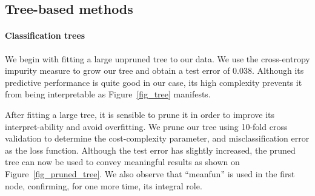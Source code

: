\subsection{Tree-based methods}
\paragraph{Classification trees}
We begin with fitting a large unpruned tree to our data. We use the cross-entropy impurity measure to grow our tree and obtain a test error of \num{0.038}. Although its predictive performance is quite good in our case, its high complexity prevents it from being interpretable as Figure~\ref{fig_tree} manifests.

After fitting a large tree, it is sensible to prune it in order to improve its interpret-ability and avoid overfitting. We prune our tree using \num{10}-fold cross validation to determine the cost-complexity parameter, and misclassification error as the loss function. Although the test error has slightly increased, the pruned tree can now be used to convey meaningful results as shown on Figure~\ref{fig_pruned_tree}. We also observe that ``meanfun'' is used in the first node, confirming, for one more time, its integral role.
\setlength{\BoxPlotFigWidth}{0.48\textwidth}
